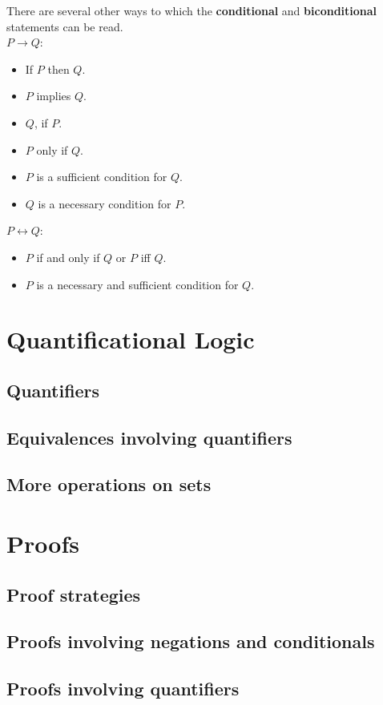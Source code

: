 \documentclass[../setup.tex]{subfiles}
\begin{document}
\begin{remark}
There are several other ways to which the \textbf{conditional} and \textbf{biconditional} statements can be read. \\
$P \rightarrow Q$:
\begin{itemize}
	\item If $P$ then $Q$.
	\item $P$ implies $Q$.
	\item $Q$, if $P$.
	\item $P$ only if $Q$.
	\item $P$ is a sufficient condition for $Q$.
	\item $Q$ is a necessary condition for $P$.
\end{itemize} 
$P \longleftrightarrow Q$:
\begin{itemize}
	\item $P$ if and only if $Q$ or $P$ iff $Q$.
	\item $P$ is a necessary and sufficient condition for $Q$.
\end{itemize}
\end{remark}



\section{Quantificational Logic}
\subsection{Quantifiers}
\subsection{Equivalences involving quantifiers}
\subsection{More operations on sets}

\section{Proofs}
\subsection{Proof strategies}
\subsection{Proofs involving negations and conditionals}
\subsection{Proofs involving quantifiers}
\end{document}
